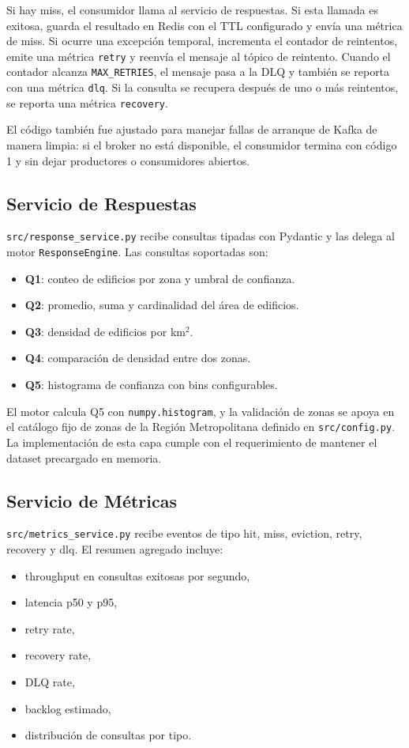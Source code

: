 \documentclass[letter,12pt]{article}
\begin{document}
Si hay miss, el consumidor llama al servicio de respuestas. Si esta llamada es exitosa, guarda el resultado en Redis con el TTL configurado y env\'ia una m\'etrica de miss. Si ocurre una excepci\'on temporal, incrementa el contador de reintentos, emite una m\'etrica \texttt{retry} y reenv\'ia el mensaje al t\'opico de reintento. Cuando el contador alcanza \texttt{MAX\_RETRIES}, el mensaje pasa a la DLQ y tambi\'en se reporta con una m\'etrica \texttt{dlq}. Si la consulta se recupera despu\'es de uno o m\'as reintentos, se reporta una m\'etrica \texttt{recovery}.

El c\'odigo tambi\'en fue ajustado para manejar fallas de arranque de Kafka de manera limpia: si el broker no est\'a disponible, el consumidor termina con c\'odigo 1 y sin dejar productores o consumidores abiertos.

\subsection{Servicio de Respuestas}
\texttt{src/response\_service.py} recibe consultas tipadas con Pydantic y las delega al motor \texttt{ResponseEngine}. Las consultas soportadas son:
\begin{itemize}
    \item \textbf{Q1}: conteo de edificios por zona y umbral de confianza.
    \item \textbf{Q2}: promedio, suma y cardinalidad del \'area de edificios.
    \item \textbf{Q3}: densidad de edificios por km$^2$.
    \item \textbf{Q4}: comparaci\'on de densidad entre dos zonas.
    \item \textbf{Q5}: histograma de confianza con bins configurables.
\end{itemize}

El motor calcula Q5 con \texttt{numpy.histogram}, y la validaci\'on de zonas se apoya en el cat\'alogo fijo de zonas de la Regi\'on Metropolitana definido en \texttt{src/config.py}. La implementaci\'on de esta capa cumple con el requerimiento de mantener el dataset precargado en memoria.

\subsection{Servicio de M\'etricas}
\texttt{src/metrics\_service.py} recibe eventos de tipo hit, miss, eviction, retry, recovery y dlq. El resumen agregado incluye:
\begin{itemize}
    \item throughput en consultas exitosas por segundo,
    \item latencia p50 y p95,
    \item retry rate,
    \item recovery rate,
    \item DLQ rate,
    \item backlog estimado,
    \item distribuci\'on de consultas por tipo.
\end{itemize}
\end{document}
